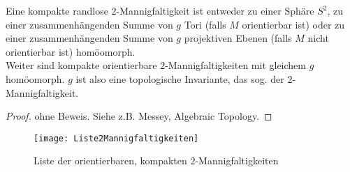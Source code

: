 \begin{theorem}
  Eine kompakte randlose \( 2 \)-Mannigfaltigkeit ist entweder zu einer Sphäre \( S^2 \), zu einer zusammenhängenden Summe von \( g \) Tori (falls \( M \) orientierbar ist) oder zu einer zusammenhängenden Summe von \( g \) projektiven Ebenen (falls \( M \) nicht orientierbar ist) homöomorph. \\
  Weiter sind kompakte orientierbare \( 2 \)-Mannigfaltigkeiten mit gleichem \( g \) homöomorph. \( g \) ist also eine topologische Invariante, das sog. \label{def:geschlecht} der \( 2 \)-Mannigfaltigkeit.
  \begin{proof}
    ohne Beweis. Siehe z.B. Messey, Algebraic Topology.
  \end{proof}
\end{theorem}

\begin{figure}[H]
  \texttt{[image: Liste2Mannigfaltigkeiten]}
  \caption{Liste der orientierbaren, kompakten \( 2 \)-Mannigfaltigkeiten}
\end{figure}

